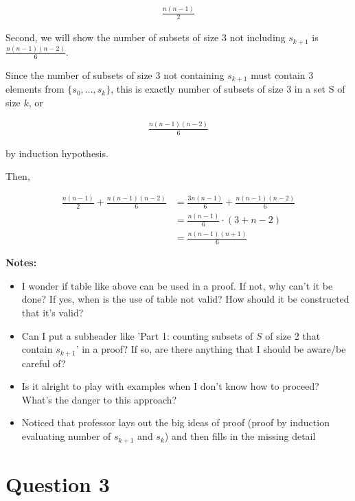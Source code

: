 \documentclass[12pt]{article}
\begin{document}
\begin{itemize}
\begin{mdframed}
        \begin{align}
            \frac{n(n-1)}{2}
        \end{align}

        \bigskip

        Second, we will show the number of subsets of size 3 not including $s_{k+1}$
        is $\frac{n(n-1)(n-2)}{6}$.

        \bigskip

        Since the number of subsets of size 3 not containing $s_{k+1}$ must contain
        3 elements from $\{s_0,\dots,s_k\}$, this is exactly number of subsets of size
        3 in a set S of size $k$, or

        \begin{align}
            \frac{n(n-1)(n-2)}{6}
        \end{align}

        by induction hypothesis.

        \bigskip

        \color{black}

        Then,

        \begin{align}
            \frac{n(n-1)}{2} + \frac{n(n-1)(n-2)}{6} &= \frac{3n(n-1)}{6} + \frac{n(n-1)(n-2)}{6}\\
            &= \frac{n(n-1)}{6} \cdot (3 + n - 2)\\
            &= \frac{n(n-1)(n+1)}{6}
        \end{align}
    \end{mdframed}

    \bigskip

    \textbf{Notes:}
    \begin{itemize}
        \item I wonder if table like above can be used in a proof. If not, why
        can't it be done? If yes, when is the use of table not valid? How should
        it be constructed that it's valid?

        \item Can I put a subheader like 'Part 1: counting subsets of $S$ of size 2
        that contain $s_{k+1}$' in a proof? If so, are there anything that I should be
        aware/be careful of?

        \item Is it alright to play with examples when I don't know how to proceed?
        What's the danger to this approach?

        \item Noticed that professor lays out the big ideas of proof (proof by induction
        evaluating number of $s_{k+1}$ and $s_k$) and then fills in the missing detail
    \end{itemize}

\end{itemize}

\section*{Question 3}
\end{document}
